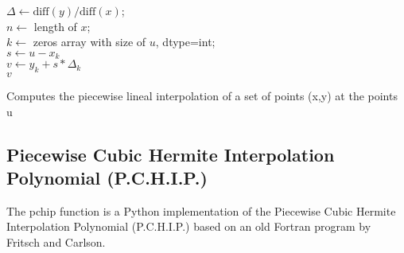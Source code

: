 \begin{algorithm}[H]
\SetAlgoLined
\DontPrintSemicolon
{}
$\Delta \gets \text{diff}(y) / \text{diff}(x)$;\\
$n \gets$ length of $x$;\\
$k \gets$ zeros array with size of $u$, dtype=int;\\
$s \gets u - x_k$\\
$v \gets y_k + s * \Delta_k$\\
\Return $v$
\caption{Computes the piecewise lineal interpolation of a set of points (x,y) at the points u}
\end{algorithm}

\subsection{Piecewise Cubic Hermite Interpolation Polynomial (P.C.H.I.P.)}
The pchip function is a Python implementation of the Piecewise Cubic Hermite Interpolation Polynomial (P.C.H.I.P.) based on an old Fortran program by Fritsch and Carlson.

